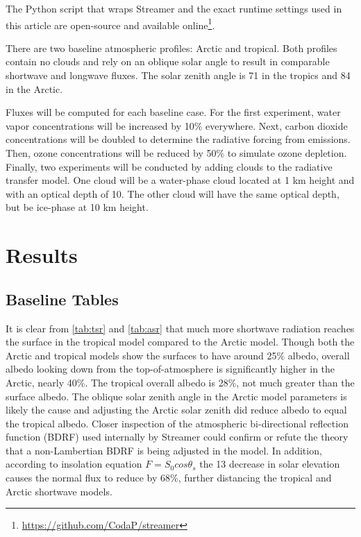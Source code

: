 \documentclass[twocol]{ametsoc}
\begin{document}
The Python script that wraps Streamer and the exact runtime settings used in this article are open-source and available online\footnote{\url{https://github.com/CodaP/streamer}}.

There are two baseline atmospheric profiles: Arctic and tropical. Both profiles contain no clouds and rely on an oblique solar angle to result in comparable shortwave and longwave fluxes. The solar zenith angle is 71\degree{} in the tropics and 84\degree{} in the Arctic.

Fluxes will be computed for each baseline case. For the first experiment, water vapor concentrations will be increased by 10\% everywhere. Next, carbon dioxide concentrations will be doubled to determine the radiative forcing from emissions. Then, ozone concentrations will be reduced by 50\% to simulate ozone depletion. Finally, two experiments will be conducted by adding clouds to the radiative transfer model. One cloud will be a water-phase cloud located at 1 km height and with an optical depth of 10. The other cloud will have the same optical depth, but be ice-phase at 10 km height.

\section{Results}

\subsection*{Baseline Tables}

It is clear from \autoref{tab:tsr} and \autoref{tab:asr} that much more shortwave radiation reaches the surface in the tropical model compared to the Arctic model. Though both the Arctic and tropical models show the surfaces to have around 25\% albedo, overall albedo looking down from the top-of-atmosphere is significantly higher in the Arctic, nearly 40\%. The tropical overall albedo is 28\%, not much greater than the surface albedo. The oblique solar zenith angle in the Arctic model parameters is likely the cause and adjusting the Arctic solar zenith did reduce albedo to equal the tropical albedo. Closer inspection of the atmospheric bi-directional reflection function (BDRF) used internally by Streamer could confirm or refute the theory that a non-Lambertian BDRF is being adjusted in the model. In addition, according to insolation equation $F = S_0 cos \theta_s$ \citep[p.~51]{petty:2008} the 13\degree{} decrease in solar elevation causes the normal flux to reduce by 68\%, further distancing the tropical and Arctic shortwave models.
\end{document}
